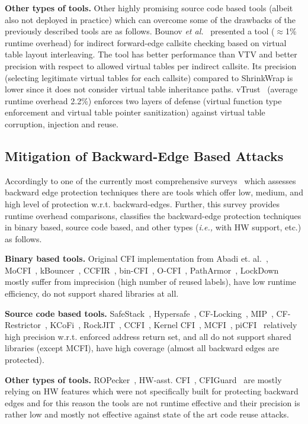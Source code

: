 \textbf{Other types of tools.} Other highly promising source code based tools (albeit also not deployed in practice) 
which can overcome some of the drawbacks of the previously described tools are as follows. 
Bounov \textit{et al.}~\cite{bounov:interleaving} presented a tool ($\approx$1\% runtime overhead)
for indirect forward-edge callsite checking based on virtual table layout interleaving. The tool has better performance than VTV and better precision with
respect to allowed virtual tables per indirect callsite. Its precision (selecting legitimate virtual tables for each callsite) compared to ShrinkWrap is
lower since it does not consider virtual table inheritance paths. vTrust~\cite{zhang:vtrust} (average runtime overhead 2.2\%) enforces two layers of defense
(virtual function type enforcement and virtual table pointer sanitization) against virtual table corruption, injection and reuse. 

\subsection{Mitigation of Backward-Edge Based Attacks}
\label{Mitigation of Return Edge Attacks}
Accordingly to one of the currently most comprehensive surveys~\cite{cfi:survey} which assesses backward edge protection techniques there are tools which
offer low, medium, and high level of protection w.r.t. backward-edges. Further, this survey 
provides runtime overhead comparisons,
classifies the backward-edge protection techniques 
in binary based, source code based, and other types (\textit{i.e.,} with HW support, etc.) as follows.

\textbf{Binary based tools.} Original CFI implementation from Abadi et. al.~\cite{abadi:cfi2}, MoCFI~\cite{mocfi}, 
kBouncer~\cite{kbouncer}, 
CCFIR~\cite{ccfir:zhang}, bin-CFI~\cite{mingwei:sekar}, O-CFI~\cite{mohan:opaque}, 
PathArmor~\cite{veen:cfi}, 
LockDown~\cite{payer:dimva} mostly suffer from imprecision (high number of reused labels), 
have low runtime efficiency, do not support shared libraries at all.

\textbf{Source code based tools.} SafeStack~\cite{safestack}, Hypersafe~\cite{hypersafe}, CF-Locking~\cite{cflocking}, MIP~\cite{mip}, 
CF-Restrictor~\cite{cfrestrictor}, KCoFi~\cite{kcocfi}, RockJIT~\cite{rockjit:niu}, CCFI~\cite{ccfi:jose}, 
Kernel CFI~\cite{kernelcfi}, MCFI~\cite{mcfi:niu}, piCFI~\cite{perinput:niu} relatively high precision
w.r.t. enforced address return set, and all do not support shared libraries (except MCFI), have high coverage (almost all backward edges are protected).

\textbf{Other types of tools.} ROPecker~\cite{ropecker}, HW-asst. CFI~\cite{davi:hardware}, 
CFIGuard~\cite{cfiguard:yuan} are mostly relying on HW features which were not specifically built for protecting backward edges and 
for this reason the tools are not runtime effective and their precision is rather low and mostly not effective against state of the art code
reuse attacks.

